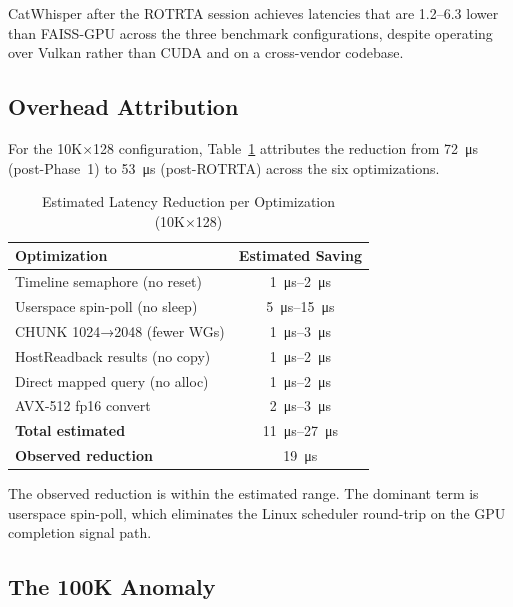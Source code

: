 \documentclass[conference]{IEEEtran}
\begin{document}
CatWhisper after the ROTRTA session achieves latencies that are
\SI{1.2}{\times}--\SI{6.3}{\times} lower than FAISS-GPU across the three
benchmark configurations, despite operating over Vulkan rather than CUDA and
on a cross-vendor codebase.

\subsection{Overhead Attribution}

For the 10K×128 configuration, Table~\ref{tab:overhead} attributes the
reduction from \SI{72}{\micro\second} (post-Phase~1) to \SI{53}{\micro\second}
(post-ROTRTA) across the six optimizations.

\begin{table}[htbp]
  \caption{Estimated Latency Reduction per Optimization (10K×128)}
  \label{tab:overhead}
  \centering
  \renewcommand{\arraystretch}{1.15}
  \begin{tabular}{lc}
    \toprule
    \textbf{Optimization} & \textbf{Estimated Saving} \\
    \midrule
    Timeline semaphore (no reset)     & \SI{1}{\micro\second}--\SI{2}{\micro\second} \\
    Userspace spin-poll (no sleep)    & \SI{5}{\micro\second}--\SI{15}{\micro\second} \\
    CHUNK 1024→2048 (fewer WGs)       & \SI{1}{\micro\second}--\SI{3}{\micro\second} \\
    HostReadback results (no copy)    & \SI{1}{\micro\second}--\SI{2}{\micro\second} \\
    Direct mapped query (no alloc)    & \SI{1}{\micro\second}--\SI{2}{\micro\second} \\
    AVX-512 fp16 convert              & \SI{2}{\micro\second}--\SI{3}{\micro\second} \\
    \midrule
    \textbf{Total estimated}          & \SI{11}{\micro\second}--\SI{27}{\micro\second} \\
    \textbf{Observed reduction}       & \SI{19}{\micro\second} \\
    \bottomrule
  \end{tabular}
\end{table}

The observed reduction is within the estimated range.  The dominant term
is userspace spin-poll, which eliminates the Linux scheduler round-trip
on the GPU completion signal path.

\subsection{The 100K Anomaly}
\end{document}
